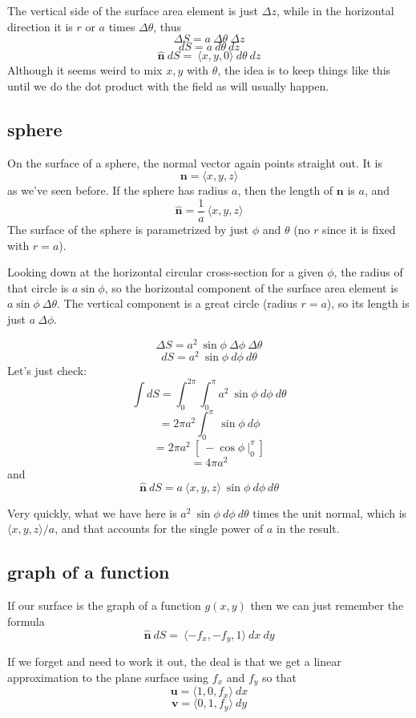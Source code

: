 \documentclass[11pt, oneside]{article}
\begin{document}
The vertical side of the surface area element is just $\Delta z$, while in the horizontal direction it is $r$ or $a$ times $\Delta \theta$, thus 
\[ \Delta S = a \ \Delta \theta \ \Delta z \]
\[ dS = a \ d \theta \ dz \]
\[ \hat{\mathbf{n}} \ dS = \ \langle x,y,0 \rangle  \ d \theta \ dz \]
Although it seems weird to mix $x,y$ with $\theta$, the idea is to keep things like this until we do the dot product with the field as will usually happen.

\subsection*{sphere}
On the surface of a sphere, the normal vector again points straight out.  It is
\[ \mathbf{n} = \langle x,y,z \rangle \]
as we've seen before.  If the sphere has radius $a$, then the length of $\mathbf{n}$ is $a$, and
\[ \hat{\mathbf{n}} = \frac{1}{a} \ \langle x,y,z \rangle \]
The surface of the sphere is parametrized by just $\phi$ and $\theta$ (no $r$ since it is fixed with $r=a$).  

Looking down at the horizontal circular cross-section for a given $\phi$, the radius of that circle is $a \sin \phi$, so the horizontal component of the surface area element is $a \sin \phi \ \Delta \theta$.  The vertical component is a great circle (radius $r = a$), so its length is just $a \ \Delta \phi$.

\[ \Delta S = a^2 \ \sin \phi \ \Delta \phi \ \Delta \theta \]
\[ dS = a^2 \ \sin \phi \ d \phi \ d \theta \]
Let's just check:
\[ \int dS = \int_0^{2 \pi} \int_0^{\pi} a^2 \ \sin \phi \ d \phi \ d \theta \]
\[ = 2 \pi a^2  \int_0^{\pi} \ \sin \phi \ d \phi \]
\[ = 2 \pi a^2 \ [ \ - \cos \phi  \ \bigg |_0^{\pi} \ ] \]
\[ = 4 \pi a^2 \]
and
\[ \hat{\mathbf{n}} \ dS = a \ \langle x,y,z \rangle   \ \sin \phi \ d \phi \ d \theta \]

Very quickly, what we have here is $a^2 \ \sin \phi \ d \phi \ d \theta$ times the unit normal, which is $ \langle x,y,z \rangle/a$, and that accounts for the single power of $a$ in the result.

\subsection*{graph of a function}
If our surface is the graph of a function $g(x,y)$ then we can just remember the formula
\[ \hat{\mathbf{n}} \ dS = \ \langle -f_x,-f_y,1 \rangle  \ dx \ dy  \]

If we forget and need to work it out, the deal is that we get a linear approximation to the plane surface using $f_x$ and $f_y$ so that
\[ \mathbf{u} = \langle 1,0,f_x \rangle \ dx \]
\[ \mathbf{v} = \langle 0,1,f_y \rangle \ dy \]
\end{document}
